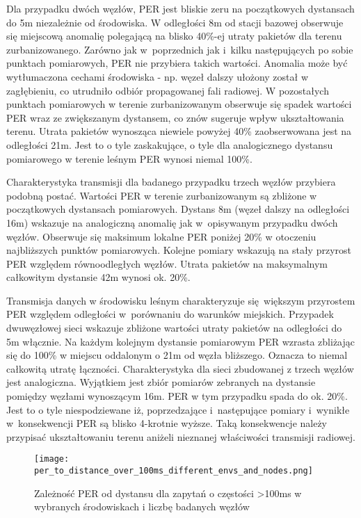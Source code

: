 Dla przypadku dwóch węzłów, PER jest bliskie zeru na początkowych dystansach do 5m niezależnie od środowiska. W odległości 8m
od stacji bazowej obserwuje się miejscową anomalię polegającą na blisko 40\%-ej utraty pakietów dla terenu zurbanizowanego.
Zarówno jak w~poprzednich jak i~kilku następujących po sobie punktach pomiarowych, PER nie przybiera takich wartości. Anomalia może
być wytłumaczona cechami środowiska - np. węzeł dalszy ułożony został w zagłębieniu, co utrudniło odbiór propagowanej fali
radiowej. W pozostałych punktach pomiarowych w terenie zurbanizowanym obserwuje się spadek wartości PER wraz ze zwiększanym dystansem,
co znów sugeruje wpływ ukształtowania terenu. Utrata pakietów wynosząca niewiele powyżej 40\% zaobserwowana jest na odległości
21m. Jest to o tyle zaskakujące, o tyle dla analogicznego dystansu pomiarowego w terenie leśnym PER wynosi niemal 100\%.

Charakterystyka transmisji dla badanego przypadku trzech węzłów przybiera podobną postać. Wartości PER w terenie zurbanizowanym są zbliżone
w początkowych dystansach pomiarowych. Dystans 8m (węzeł dalszy na odległości 16m) wskazuje na analogiczną anomalię jak w~opisywanym
przypadku dwóch węzłów. Obserwuje się maksimum lokalne PER poniżej 20\% w otoczeniu najbliższych punktów pomiarowych. Kolejne pomiary
wskazują na stały przyrost PER względem równoodległych węzłów. Utrata pakietów na maksymalnym całkowitym dystansie 42m wynosi ok. 20\%.

Transmisja danych w środowisku leśnym charakteryzuje się większym przyrostem PER względem odległości w~porównaniu do warunków miejskich.
Przypadek dwuwęzłowej sieci wskazuje zbliżone wartości utraty pakietów na odległości do 5m włącznie. Na każdym kolejnym dystansie
pomiarowym PER wzrasta zbliżając się do 100\% w miejscu oddalonym o 21m od węzła bliższego. Oznacza to niemal całkowitą utratę łączności.
Charakterystyka dla sieci zbudowanej z trzech węzłów jest analogiczna. Wyjątkiem jest zbiór pomiarów zebranych na dystansie pomiędzy węzłami
wynoszącym 16m. PER w tym przypadku spada do ok. 20\%. Jest to o tyle niespodziewane iż, poprzedzające i~następujące pomiary i~wynikłe
w~konsekwencji PER są blisko 4-krotnie wyższe. Taką konsekwencje należy przypisać ukształtowaniu terenu aniżeli nieznanej właściwości
transmisji radiowej.

\begin{figure}[!htb]
	\centering \texttt{[image: per\_to\_distance\_over\_100ms\_different\_envs\_and\_nodes.png]}
	\caption{Zależność \gls{PER} od dystansu dla zapytań o częstości >100ms w wybranych środowiskach i liczbę badanych węzłów}
	\label{rys:per_to_distance_over_100ms_different_envs_and_nodes}
\end{figure}

